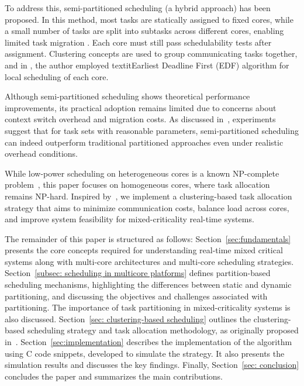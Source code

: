 \documentclass[conference]{IEEEtran}
\begin{document}
To address this, semi-partitioned scheduling (a hybrid approach) has been proposed. In this method, most tasks are statically assigned to fixed cores, while a small number of tasks are split into subtasks across different cores, enabling limited task migration \cite{AbdallahGB24}. Each core must still pass schedulability tests after assignment. Clustering concepts are used to group communicating tasks together, and in \cite{AbdallahGB24}, the author employed textit{Earliest Deadline First (EDF)} algorithm for local scheduling of each core.

Although semi-partitioned scheduling shows theoretical performance improvements, its practical adoption remains limited due to concerns about context switch overhead and migration costs. As discussed in~\cite{5953668}, experiments suggest that for task sets with reasonable parameters, semi-partitioned scheduling can indeed outperform traditional partitioned approaches even under realistic overhead conditions.

While low-power scheduling on heterogeneous cores is a known NP-complete problem~\cite{7832222}, this paper focuses on homogeneous cores, where task allocation remains NP-hard. Inspired by~\cite{AbdallahGB24}, we implement a clustering-based task allocation strategy that aims to minimize communication costs, balance load across cores, and improve system feasibility for mixed-criticality real-time systems.

The remainder of this paper is structured as follows: 
Section~\ref{sec:fundamentals} presents the core concepts required for understanding real-time mixed critical systems along with multi-core architectures and multi-core scheduling strategies.
Section~\ref{subsec: scheduling in multicore platforms} defines partition-based scheduling mechanisms, highlighting the differences between static and dynamic partitioning, and discussing the objectives and challenges associated with partitioning. The importance of task partitioning in mixed-criticality systems is also discussed. 
Section~\ref{sec: clustering-based scheduling} outlines the clustering-based scheduling strategy and task allocation methodology, as originally proposed in~\cite{AbdallahGB24}. 
Section~\ref{sec:implementation} describes the implementation of the algorithm using C code snippets, developed to simulate the strategy. It also presents the simulation results and discusses the key findings. 
Finally, Section~\ref{sec: conclusion} concludes the paper and summarizes the main contributions.
\end{document}
